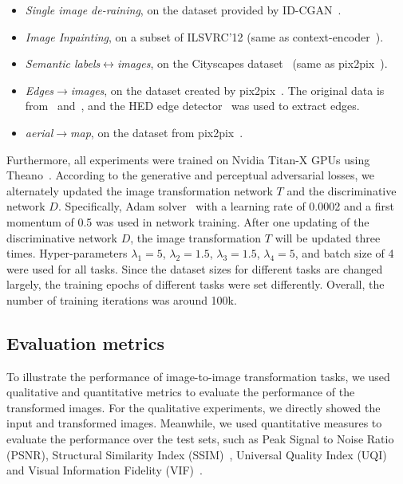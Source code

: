 \documentclass{article}
\begin{document}
\begin{itemize}
\item \emph{Single image de-raining}, on the dataset provided by ID-CGAN~\cite{zhang2017image}. 
\item \emph{Image Inpainting}, on a subset of ILSVRC'12 (same as context-encoder~\cite{pathak2016context}).
\item \emph{Semantic labels$\leftrightarrow$images}, on the Cityscapes dataset~\cite{cordts2016cityscapes} (same as pix2pix~\cite{isola2016image}).
\item \emph{Edges$\to$images}, on the dataset created by pix2pix~\cite{isola2016image}. The original data is from~\cite{zhu2016generative} and~\cite{yu2014fine}, and the HED edge detector~\cite{xie2015holistically} was used to extract edges.
\item \emph{aerial$\to$map}, on the dataset from pix2pix~\cite{isola2016image}.
\end{itemize}

Furthermore, all experiments were trained on Nvidia Titan-X GPUs using Theano~\cite{bergstra2010theano}. According to the generative and perceptual adversarial losses, we alternately updated the image transformation network $T$ and the discriminative network $D$. Specifically, Adam solver~\cite{kingma2014adam} with a learning rate of 0.0002 and a first momentum of 0.5 was used in network training. After one updating of the discriminative network $D$, the image transformation $T$ will be updated three times. Hyper-parameters $\lambda_1=5$, $\lambda_2=1.5$, $\lambda_3=1.5$, $\lambda_4=5$, and batch size of 4 were used for all tasks. Since the dataset sizes for different tasks are changed largely, the training epochs of different tasks were set differently. Overall, the number of training iterations was around 100k. 

\subsection{Evaluation metrics}
To illustrate the performance of image-to-image transformation tasks, we used qualitative and quantitative metrics to evaluate the performance of the transformed images. For the qualitative experiments, we directly showed the input and transformed images. Meanwhile, we used quantitative measures to evaluate the performance over the test sets, such as Peak Signal to Noise Ratio (PSNR), Structural Similarity Index (SSIM)~\cite{wang2004image}, Universal Quality Index (UQI)~\cite{995823} and Visual Information Fidelity (VIF)~\cite{sheikh2006image}. 
\end{document}
